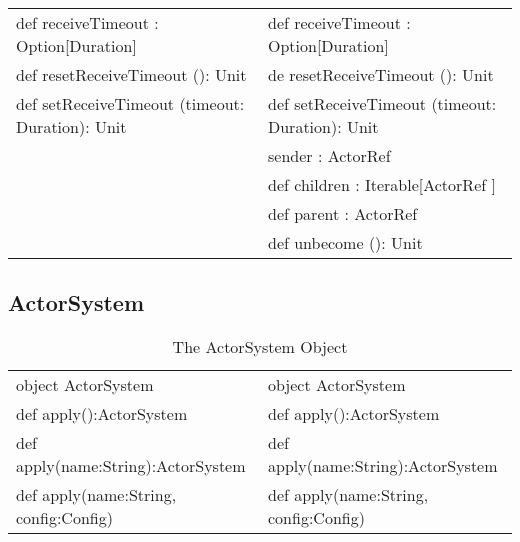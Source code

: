 \begin{table}[h]
\begin{tabular}{ l ||  l }
def receiveTimeout : Option[Duration] & def receiveTimeout : Option[Duration]\\

def resetReceiveTimeout (): Unit & de resetReceiveTimeout (): Unit\\

def setReceiveTimeout (timeout: Duration): Unit & def setReceiveTimeout (timeout: Duration): Unit\\

& sender : ActorRef\\
& def children : Iterable[ActorRef ]\\
& def parent : ActorRef\\
& def unbecome (): Unit\\

  \end{tabular}
\end{table}
\subsection{ActorSystem}

\begin{table}[h]\footnotesize
  \caption{The ActorSystem Object}
  \label{actorSystem_object}
  \centering
  \begin{tabular}{ l ||  l }
object ActorSystem & object ActorSystem \\
def apply():ActorSystem & def apply():ActorSystem \\
def apply(name:String):ActorSystem &def apply(name:String):ActorSystem\\
def apply(name:String, config:Config) & def apply(name:String, config:Config) \\
  \end{tabular}
\end{table}

